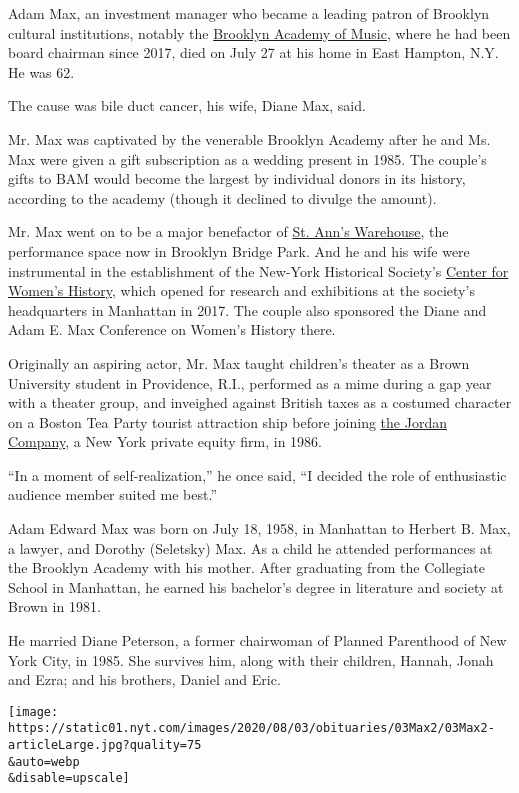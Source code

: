 Adam Max, an investment manager who became a leading patron of Brooklyn
cultural institutions, notably the \href{https://www.bam.org/}{Brooklyn
Academy of Music}, where he had been board chairman since 2017, died on
July 27 at his home in East Hampton, N.Y. He was 62.

The cause was bile duct cancer, his wife, Diane Max, said.

Mr. Max was captivated by the venerable Brooklyn Academy after he and
Ms. Max were given a gift subscription as a wedding present in 1985. The
couple's gifts to BAM would become the largest by individual donors in
its history, according to the academy (though it declined to divulge the
amount).

Mr. Max went on to be a major benefactor of
\href{https://stannswarehouse.org/}{St. Ann's Warehouse}, the
performance space now in Brooklyn Bridge Park. And he and his wife were
instrumental in the establishment of the New-York Historical Society's
\href{https://www.nyhistory.org/womens-history}{Center for Women's
History}, which opened for research and exhibitions at the society's
headquarters in Manhattan in 2017. The couple also sponsored the Diane
and Adam E. Max Conference on Women's History there.

Originally an aspiring actor, Mr. Max taught children's theater as a
Brown University student in Providence, R.I., performed as a mime during
a gap year with a theater group, and inveighed against British taxes as
a costumed character on a Boston Tea Party tourist attraction ship
before joining \href{https://www.thejordancompany.com/}{the Jordan
Company}, a New York private equity firm, in 1986.

``In a moment of self-realization,'' he once said, ``I decided the role
of enthusiastic audience member suited me best.''

Adam Edward Max was born on July 18, 1958, in Manhattan to Herbert B.
Max, a lawyer, and Dorothy (Seletsky) Max. As a child he attended
performances at the Brooklyn Academy with his mother. After graduating
from the Collegiate School in Manhattan, he earned his bachelor's degree
in literature and society at Brown in 1981.

He married Diane Peterson, a former chairwoman of Planned Parenthood of
New York City, in 1985. She survives him, along with their children,
Hannah, Jonah and Ezra; and his brothers, Daniel and Eric.

\texttt{[image: https://static01.nyt.com/images/2020/08/03/obituaries/03Max2/03Max2-articleLarge.jpg?quality=75\\\&auto=webp\\\&disable=upscale]}

